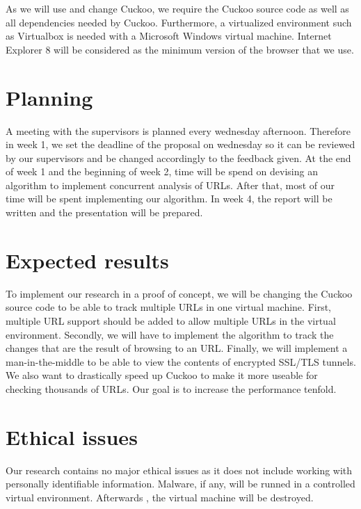 \documentclass{scrartcl}
\begin{document}
As we will use and change Cuckoo, we require the Cuckoo source code as well as all dependencies needed by Cuckoo. Furthermore, a virtualized environment such as Virtualbox is needed with a Microsoft Windows virtual machine. Internet Explorer 8 will be considered as the minimum version of the browser that we use.

\section{Planning}

A meeting with the supervisors is planned every wednesday afternoon. Therefore in week 1, we set the deadline of the proposal on wednesday so it can be reviewed by our supervisors and be changed accordingly to the feedback given. At the end of week 1 and the beginning of week 2, time will be spend on devising an algorithm to implement concurrent analysis of URLs. After that, most of our time will be spent implementing our algorithm. In week 4, the report will be written and the presentation will be prepared.

\section{Expected results}

To implement our research in a proof of concept, we will be changing the Cuckoo source code to be able to track multiple URLs in one virtual machine. First, multiple URL support should be added to allow multiple URLs in the virtual environment. Secondly, we will have to implement the algorithm to track the changes that are the result of browsing to an URL. Finally, we will implement a man-in-the-middle to be able to view the contents of encrypted SSL/TLS tunnels.\\

We also want to drastically speed up Cuckoo to make it more useable for checking thousands of URLs. Our goal is to increase the performance tenfold.

\section{Ethical issues}

Our research contains no major ethical issues as it does not include working with personally identifiable information. Malware, if any, will be runned in a controlled virtual environment. Afterwards , the virtual machine will be destroyed.



\end{document}
